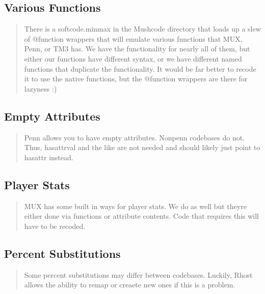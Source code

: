 \documentclass[letterpaper,10pt,english]{sphinxmanual}
\begin{document}
\subsection{Various Functions}
\label{\detokenize{differences:various-functions}}\begin{quote}

\sphinxAtStartPar
There is a \textquotesingle{}softcode.minmax\textquotesingle{} in the Mushcode directory that loads up a slew
of @function wrappers that will emulate various functions that MUX, Penn, or
TM3 has.  We have the functionality for nearly all of them, but either our
functions have different syntax, or we have different named functions that
duplicate the functionality.  It would be far better to recode it to use
the native functions, but the @function wrappers are there for lazyness :)
\end{quote}


\subsection{Empty Attributes}
\label{\detokenize{differences:empty-attributes}}\begin{quote}

\sphinxAtStartPar
Penn allows you to have empty attributes.  Non\sphinxhyphen{}penn codebases do not.
Thus, hasattrval and the like are not needed and should likely just point
to hasattr instead.
\end{quote}


\subsection{Player Stats}
\label{\detokenize{differences:player-stats}}\begin{quote}

\sphinxAtStartPar
MUX has some built in ways for player stats.  We do as well but they\textquotesingle{}re
either done via functions or attribute contents.  Code that requires this
will have to be recoded.
\end{quote}


\subsection{Percent Substitutions}
\label{\detokenize{differences:percent-substitutions}}\begin{quote}

\sphinxAtStartPar
Some percent substitutions may differ between codebases.  Luckily, Rhost
allows the ability to remap or creaete new ones if this is a problem.
\end{quote}
\end{document}
